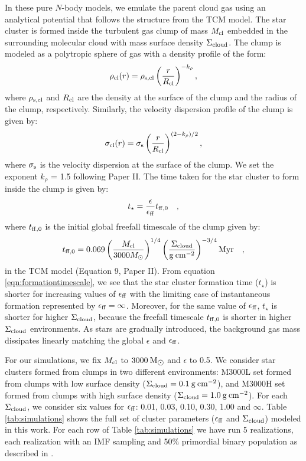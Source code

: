 \documentclass[fleqn,usenatbib]{mnras}
\newcommand\sfeff{\ensuremath{\epsilon_{\rm ff}}\xspace}   %
\newcommand\Sigmacloud{\ensuremath{\Sigma_{\rm cloud}}\xspace} %
\newcommand\Mcl{\ensuremath{M_{\rm cl}}\xspace} %
\newcommand{\msun}{\ensuremath{\rm M_{\sun}}\xspace}  %
\begin{document}
In these pure $N$-body models, we emulate the parent cloud gas using an analytical potential that follows the structure from the TCM model. The star cluster is formed inside the turbulent gas clump of mass \Mcl embedded in the surrounding molecular cloud with mass surface density \Sigmacloud. The clump is modeled as a polytropic sphere of gas with a density profile of the form:
\begin{eqnarray}
    \rho_{\rm cl} (r) = \rho_{\rm s,cl} \left( \frac{r}{R_{\rm cl}} \right)^{-k_{\rho}},
    \label{eqn:polytropicdensity}
\end{eqnarray}
where $\rho_{\rm s,cl}$ and $R_{\rm cl}$ are the density at the surface of the clump and the radius of the clump, respectively. Similarly, the velocity dispersion profile of the clump is given by:
\begin{eqnarray}
    \sigma_{\rm cl} (r) = \sigma_{\rm s} \left( \frac{r}{R_{\rm cl}} \right)^{(2-k_{\rho})/2},
    \label{eqn:polytropicvelocitydispersion}
\end{eqnarray}
where $\sigma_{\rm s}$ is the velocity dispersion at the surface of the clump. We set the exponent $k_{\rho}$ = 1.5 following Paper II. The time taken for the star cluster to form inside the clump is given by:
\begin{eqnarray}
    t_\star = \frac{\epsilon}{\sfeff} t_{\rm ff, 0} \quad,
    \label{eqn:formationtimescale}
\end{eqnarray}
where $t_{\rm ff,0}$ is the initial global freefall timescale of the clump given by:
\begin{eqnarray}
    t_{\rm ff,0} = 0.069 \left( \frac{\Mcl}{3000 M_\odot}\right)^{1/4} \left( \frac{\Sigmacloud}{\rm g\: cm^{-2}}\right)^{-3/4} \rm{Myr} \quad,
    \label{eqn:freefalltimescale}
\end{eqnarray}
in the TCM model (Equation 9, Paper II). From equation \ref{eqn:formationtimescale}, we see that the star cluster formation time ($t_\star$) is shorter for increasing values of \sfeff with the limiting case of instantaneous formation represented by $\sfeff=\infty$. Moreover, for the same value of $\epsilon_{\rm ff}$, $t_\star$ is shorter for higher \Sigmacloud, because the freefall timescale $t_{\rm ff,0}$ is shorter in higher \Sigmacloud environments. As stars are gradually introduced, the background gas mass dissipates linearly matching the global $\epsilon$ and \sfeff.

For our simulations, we fix \Mcl to $3000\:\msun$ and $\epsilon$ to 0.5. We consider star clusters formed from clumps in two different environments: M3000L set formed from clumps with low surface density ($\Sigma_{\rm cloud}= 0.1\: \rm g\: cm^{-2}$), and M3000H set formed from clumps with high surface density ($\Sigma_{\rm cloud}= 1.0\: \rm g\: cm^{-2}$). For each \Sigmacloud, we consider six values for $\epsilon_{\rm ff}$: 0.01, 0.03, 0.10, 0.30, 1.00 and $\infty$. Table \ref{tab:simulations} shows the full set of cluster parameters (\sfeff and \Sigmacloud) modeled in this work. For each row of Table \ref{tab:simulations} we have run 5 realizations, each realization with an IMF sampling \citep{Kroupa2001MNRAS.322..231K} and 50\% primordial binary population as described in \cite{Farias2023arXiv230108997F}.
\end{document}
